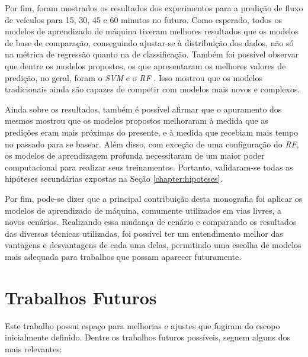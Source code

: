 Por fim, foram mostrados os resultados dos experimentos para a predição de fluxo de veículos para 15, 30, 45 e 60 minutos no futuro. Como esperado, todos os modelos de aprendizado de máquina tiveram melhores resultados que os modelos de base de comparação, conseguindo ajustar-se à distribuição dos dados, não só na métrica de regressão quanto na de classificação. Também foi possível observar que dentre os modelos propostos, os que apresentaram os melhores valores de predição, no geral, foram o \textit{\acrshort{SVM}} e o \textit{\acrshort{RF}} . Isso mostrou que os modelos tradicionais ainda são capazes de competir com modelos mais novos e complexos. 

Ainda sobre os resultados, também é possível afirmar que o apuramento dos mesmos mostrou que os modelos propostos melhoraram à medida que as predições eram mais próximas do presente, e à medida que recebiam mais tempo no passado para se basear. Além disso, com exceção de uma configuração do \textit{\acrshort{RF}}, os modelos de aprendizagem profunda necessitaram de um maior poder computacional para realizar seus treinamentos. Portanto, validaram-se todas as hipóteses secundárias expostas na Seção \ref{chapter:hipoteses}.

Por fim, pode-se dizer que a principal contribuição desta monografia foi aplicar os modelos de aprendizado de máquina, comumente utilizados em vias livres, a novos cenários. Realizando essa mudança de cenário e comparando os resultados das diversas técnicas utilizadas, foi possível ter um entendimento melhor das vantagens e desvantagens de cada uma delas, permitindo uma escolha de modelos mais adequada para trabalhos que possam aparecer futuramente.

\section{Trabalhos Futuros}

Este trabalho possui espaço para melhorias e ajustes que fugiram do escopo inicialmente definido. Dentre os trabalhos futuros possíveis, seguem alguns dos mais relevantes:

